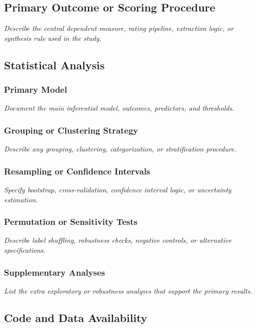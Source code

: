 \documentclass[12pt,a4paper]{article}
\newcommand{\placeholder}[1]{\textit{#1}}
\begin{document}
\subsection{Primary Outcome or Scoring Procedure}

\placeholder{Describe the central dependent measure, rating pipeline, extraction logic, or synthesis rule used in the study.}

\subsection{Statistical Analysis}

\subsubsection{Primary Model}

\placeholder{Document the main inferential model, outcomes, predictors, and thresholds.}

\subsubsection{Grouping or Clustering Strategy}

\placeholder{Describe any grouping, clustering, categorization, or stratification procedure.}

\subsubsection{Resampling or Confidence Intervals}

\placeholder{Specify bootstrap, cross-validation, confidence interval logic, or uncertainty estimation.}

\subsubsection{Permutation or Sensitivity Tests}

\placeholder{Describe label shuffling, robustness checks, negative controls, or alternative specifications.}

\subsubsection{Supplementary Analyses}

\placeholder{List the extra exploratory or robustness analyses that support the primary results.}

\subsection{Code and Data Availability}
\end{document}
